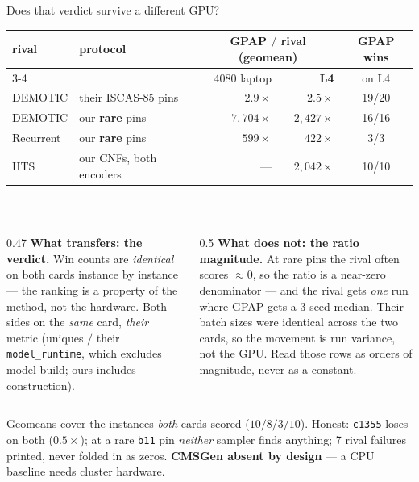 \documentclass[aspectratio=169,11pt]{beamer}
\newcommand{\good}[1]{\textcolor{gpapgreen}{#1}}
\newcommand{\bad}[1]{\textcolor{gpapred}{#1}}
\newcommand{\rem}[1]{{\footnotesize\textcolor{gpapgray}{#1}}}
\newcommand{\keyw}[1]{\textcolor{gpapblue}{\textbf{#1}}}
\begin{document}
\begin{frame}{Does that verdict survive a different GPU?}
  \centering
  \small
  \begin{tabular}{@{}llrrc@{}}
    \toprule
    rival & protocol & \multicolumn{2}{c}{GPAP $/$ rival (geomean)} & GPAP wins \\
    \cmidrule(lr){3-4}
     & & 4080 laptop & \textbf{L4} & on L4 \\
    \midrule
    DEMOTIC   & their ISCAS-85 pins     & $2.9\times$     & $2.5\times$     & \good{19/20} \\
    DEMOTIC   & our \keyw{rare} pins    & $7{,}704\times$ & $2{,}427\times$ & \good{16/16} \\
    Recurrent & our \keyw{rare} pins    & $599\times$     & $422\times$     & \good{3/3} \\
    HTS       & our CNFs, both encoders & ---             & $2{,}042\times$ & \good{10/10} \\
    \bottomrule
  \end{tabular}
  \\[0.9em]
  \begin{columns}[T]
    \begin{column}{0.47\textwidth}
      \good{\textbf{What transfers: the verdict.}} Win counts are \emph{identical} on both cards
      instance by instance --- the ranking is a property of the method, not the hardware.
      \rem{Both sides on the \emph{same} card, \emph{their} metric (uniques $/$ their
      \texttt{model\_runtime}, which excludes model build; ours includes construction).}
    \end{column}
    \begin{column}{0.5\textwidth}
      \bad{\textbf{What does not: the ratio magnitude.}} At rare pins the rival often scores
      ${\approx}0$, so the ratio is a near-zero denominator --- and the rival gets \emph{one} run
      where GPAP gets a 3-seed median.
      \rem{Their batch sizes were identical across the two cards, so the movement is run
      variance, not the GPU. Read those rows as orders of magnitude, never as a constant.}
    \end{column}
  \end{columns}
  \vspace{0.3em}
  \centering
  \rem{Geomeans cover the instances \emph{both} cards scored ($10/8/3/10$). \bad{Honest}:
  \texttt{c1355} loses on both ($0.5\times$); at a rare \texttt{b11} pin \emph{neither} sampler
  finds anything; 7 rival failures printed, never folded in as zeros.
  \keyw{CMSGen absent by design} --- a CPU baseline needs cluster hardware.}
\end{frame}
\end{document}
